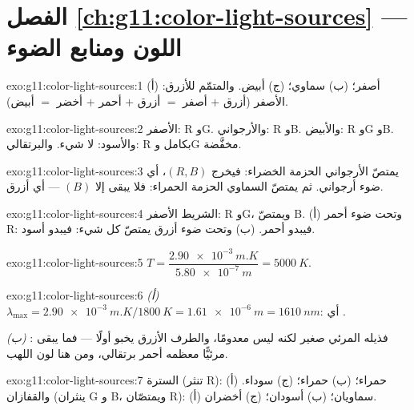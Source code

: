\section*{الفصل \ref{ch:g11:color-light-sources} --- اللون ومنابع الضوء}

\begin{solution}{exo:g11:color-light-sources:1}
(أ) أصفر؛ (ب) سماوي؛ (ج) أبيض. والمتمّم للأزرق: الأصفر
(أزرق $+$ أصفر $=$ أزرق $+$ أحمر $+$ أخضر $=$ أبيض).
\end{solution}

\begin{solution}{exo:g11:color-light-sources:2}
الأصفر: R وG. والأرجواني: R وB. والأبيض: R وG وB. والأسود: لا شيء. والبرتقالي: R
بكامل  وG  مخفَّضة.
\end{solution}

\begin{solution}{exo:g11:color-light-sources:3}
يمتصّ الأرجواني الحزمة الخضراء: فيخرج $(R, B)$، أي ضوء أرجواني. ثم
يمتصّ  السماوي الحزمة الحمراء: فلا يبقى إلا $(B)$ --- أي أزرق.
\end{solution}

\begin{solution}{exo:g11:color-light-sources:4}
الشريط الأصفر:  R وG، ويمتصّ B. (أ) وتحت ضوء أحمر
 R: فيبدو أحمر. (ب) وتحت ضوء أزرق يمتصّ كل شيء: فيبدو أسود.
\end{solution}

\begin{solution}{exo:g11:color-light-sources:5}
$T = \dfrac{\qty{2.90e-3}{m.K}}{\qty{5.80e-7}{m}} = \qty{5000}{K}$.
\end{solution}

\begin{solution}{exo:g11:color-light-sources:6}
\emph{(أ)} $\lambda_{\max} = \qty{2.90e-3}{m.K}/\qty{1800}{K}
= \qty{1.61e-6}{m} = \qty{1610}{nm}$: أي .

\emph{(ب)} : فذيله المرئي صغير لكنه ليس
معدومًا، والطرف الأزرق يخبو أولًا --- فما يبقى مرئيًّا معظمه
أحمر برتقالي، ومن هنا لون اللهب.
\end{solution}

\begin{solution}{exo:g11:color-light-sources:7}
السترة (تنثر R): (أ) حمراء؛ (ب) حمراء؛ (ج) سوداء. والقفازان (ينثران G و
B، ويمتصّان R): (أ) سماويان؛ (ب) أسودان؛ (ج) أخضران.
\end{solution}

